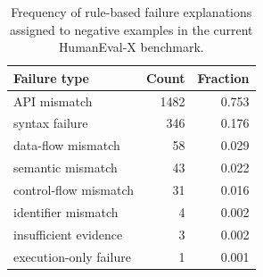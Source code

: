 \begin{table}[!htbp]
\centering
\scriptsize
\begin{tabular}{lrr}
\toprule
Failure type & Count & Fraction \\
\midrule
API mismatch & 1482 & 0.753 \\
syntax failure & 346 & 0.176 \\
data-flow mismatch & 58 & 0.029 \\
semantic mismatch & 43 & 0.022 \\
control-flow mismatch & 31 & 0.016 \\
identifier mismatch & 4 & 0.002 \\
insufficient evidence & 3 & 0.002 \\
execution-only failure & 1 & 0.001 \\
\bottomrule
\end{tabular}
\vspace{0.5em}
\caption{Frequency of rule-based failure explanations assigned to negative examples in the current HumanEval-X benchmark.}
\label{tab:failure-summary}
\end{table}
